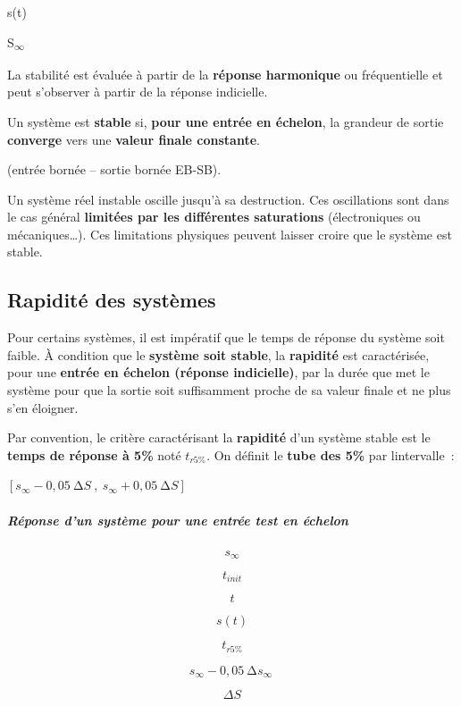 s(t)

S\textsubscript{$\infty$}

La stabilité est évaluée à partir de la \textbf{réponse harmonique} ou
fréquentielle et peut s'observer à partir de la réponse indicielle.

Un système est \textbf{stable} si, \textbf{pour une entrée en échelon},
la grandeur de sortie \textbf{converge} vers une \textbf{valeur finale
constante}.

(entrée bornée -- sortie bornée EB-SB).

Un système réel instable oscille jusqu'à sa destruction. Ces
oscillations sont dans le cas général \textbf{limitées par les
différentes saturations} (électroniques ou mécaniques\ldots). Ces
limitations physiques peuvent laisser croire que le système est stable.

\subsection{Rapidité des systèmes}\label{rapidituxe9-des-systuxe8mes}

Pour certains systèmes, il est impératif que le temps de réponse du
système soit faible. À condition que le \textbf{système soit stable}, la
\textbf{rapidité} est caractérisée, pour une \textbf{entrée en échelon
(réponse indicielle)}, par la durée que met le système pour que la
sortie soit suffisamment proche de sa valeur finale et ne plus s'en
éloigner.

Par convention, le critère caractérisant la \textbf{rapidité} d'un
système stable est le \textbf{temps de réponse à 5\%} noté
\(t_{r5\%}\)\emph{.} On définit le \textbf{tube des 5\%} par
l\textquotesingle intervalle~:

\(\left\lbrack s_{\infty} - 0,05\ \mathrm{\Delta}S\ ,\ s_{\infty} + 0,05\ \mathrm{\Delta}S \right\rbrack\)

\subparagraph*{Réponse d'un système pour une entrée test en
échelon}\label{ruxe9ponse-dun-systuxe8me-pour-une-entruxe9e-test-en-uxe9chelon}

\[s_{\infty}\]

\[t_{init}\]

\[t\]

\[s(t)\]

\[t_{r5\%}\]

\[s_{\infty} - 0,05\ \mathrm{\Delta}s_{\infty}\ \]

\[\Delta S\]

